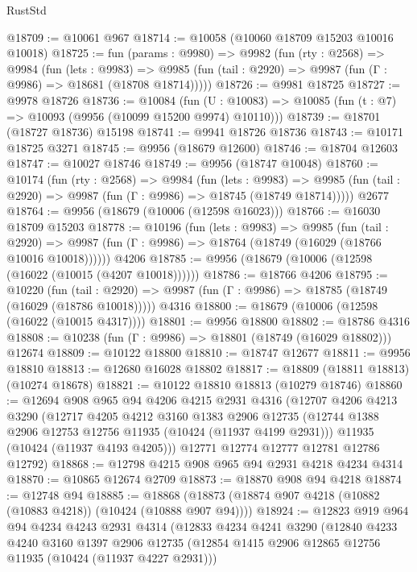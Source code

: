 \begin{lexlean}{RustStd}
\begin{coremodule}
@18709 := @10061 @967
@18714 := @10058 (@10060 @18709 @15203 @10016 @10018)
@18725 := fun (params : @9980) =>
  @9982
    (fun (rty : @2568) =>
    @9984
      (fun (lets : @9983) =>
      @9985 (fun (tail : @2920) => @9987 (fun (Γ : @9986) => @18681 (@18708 @18714)))))
@18726 := @9981 @18725
@18727 := @9978 @18726
@18736 := @10084
    (fun (U : @10083) => @10085 (fun (t : @7) => @10093 (@9956 (@10099 @15200 @9974) @10110)))
@18739 := @18701 (@18727 @18736) @15198
@18741 := @9941 @18726 @18736
@18743 := @10171 @18725 @3271
@18745 := @9956 (@18679 @12600)
@18746 := @18704 @12603
@18747 := @10027 @18746
@18749 := @9956 (@18747 @10048)
@18760 := @10174
    (fun (rty : @2568) =>
    @9984
      (fun (lets : @9983) =>
      @9985 (fun (tail : @2920) => @9987 (fun (Γ : @9986) => @18745 (@18749 @18714)))))
    @2677
@18764 := @9956 (@18679 (@10006 (@12598 @16023)))
@18766 := @16030 @18709 @15203
@18778 := @10196
    (fun (lets : @9983) =>
    @9985
      (fun (tail : @2920) =>
      @9987 (fun (Γ : @9986) => @18764 (@18749 (@16029 (@18766 @10016 @10018))))))
    @4206
@18785 := @9956 (@18679 (@10006 (@12598 (@16022 (@10015 (@4207 @10018))))))
@18786 := @18766 @4206
@18795 := @10220
    (fun (tail : @2920) => @9987 (fun (Γ : @9986) => @18785 (@18749 (@16029 (@18786 @10018)))))
    @4316
@18800 := @18679 (@10006 (@12598 (@16022 (@10015 @4317))))
@18801 := @9956 @18800
@18802 := @18786 @4316
@18808 := @10238 (fun (Γ : @9986) => @18801 (@18749 (@16029 @18802))) @12674
@18809 := @10122 @18800
@18810 := @18747 @12677
@18811 := @9956 @18810
@18813 := @12680 @16028 @18802
@18817 := @18809 (@18811 @18813) (@10274 @18678)
@18821 := @10122 @18810 @18813 (@10279 @18746)
@18860 := @12694
    @908
    @965
    @94
    @4206
    @4215
    @2931
    @4316
    (@12707
      @4206
      @4213
      @3290
      (@12717
        @4205
        @4212
        @3160
        @1383
        @2906
        @12735
        (@12744 @1388 @2906 @12753 @12756 @11935 (@10424 (@11937 @4199 @2931)))
        @11935
        (@10424 (@11937 @4193 @4205)))
      @12771
      @12774
      @12777
      @12781
      @12786
      @12792)
@18868 := @12798 @4215 @908 @965 @94 @2931 @4218 @4234 @4314
@18870 := @10865 @12674 @2709
@18873 := @18870 @908 @94 @4218
@18874 := @12748 @94
@18885 := @18868 (@18873 (@18874 @907 @4218 (@10882 (@10883 @4218)) (@10424 (@10888 @907 @94))))
@18924 := @12823
    @919
    @964
    @94
    @4234
    @4243
    @2931
    @4314
    (@12833
      @4234
      @4241
      @3290
      (@12840
        @4233
        @4240
        @3160
        @1397
        @2906
        @12735
        (@12854 @1415 @2906 @12865 @12756 @11935 (@10424 (@11937 @4227 @2931)))

\end{coremodule}
\end{lexlean}
